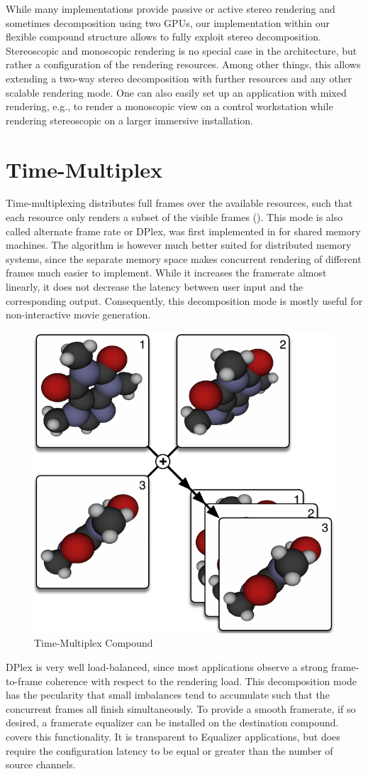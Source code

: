 While many implementations provide passive or active stereo rendering and
sometimes decomposition using two GPUs, our implementation within our flexible
compound structure allows to fully exploit stereo decomposition.  Stereoscopic
and monoscopic rendering is no special case in the architecture, but rather a
configuration of the rendering resources. Among other things, this allows
extending a two-way stereo decomposition with further resources and any other
scalable rendering mode. One can also easily set up an application with mixed
rendering, e.g., to render a monoscopic view on a control workstation while
rendering stereoscopic on a larger immersive installation.


\section{Time-Multiplex}

Time-multiplexing distributes full frames over the available resources, such
that each resource only renders a subset of the visible frames ().
This mode is also called alternate frame rate or DPlex, was first implemented in
\cite{BRE:05} for shared memory machines. The algorithm is however much better
suited for distributed memory systems, since the separate memory space makes
concurrent rendering of different frames much easier to implement. While it
increases the framerate almost linearly, it does not decrease the latency
between user input and the corresponding output. Consequently, this
decomposition mode is mostly useful for non-interactive movie generation.

\begin{figure}
\includegraphics[width=.382\textwidth]{images/DPlex}
{\caption{\label{fDPlex}Time-Multiplex Compound}} \end{figure}

DPlex is very well load-balanced, since most applications observe a strong
frame-to-frame coherence with respect to the rendering load. This decomposition
mode has the pecularity that small imbalances tend to accumulate such that the
concurrent frames all finish simultaneously. To provide a smooth framerate, if
so desired, a \textsf{framerate equalizer} can be installed on the destination
compound.  covers this functionality. It is transparent to
\textsf{Equalizer} applications, but does require the configuration latency to
be equal or greater than the number of source channels.

